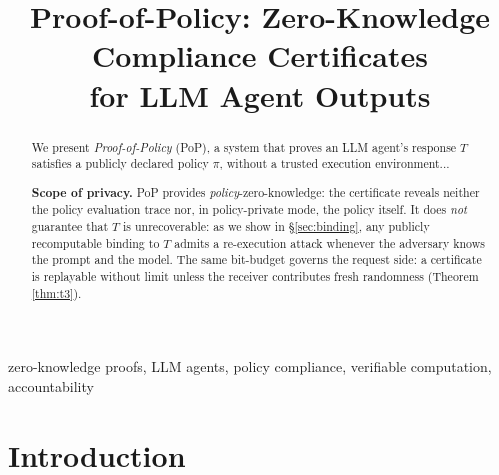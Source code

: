 \documentclass[journal]{IEEEtran}
\newcommand{\need}[1]{}
\newcommand{\need}[1]{\textcolor{blue}{[[ NEED: #1 ]]}}
\begin{document}
\title{Proof-of-Policy: Zero-Knowledge Compliance Certificates\\ for LLM Agent Outputs}

\author{\need{authors}}
\maketitle

\begin{abstract}
We present \emph{Proof-of-Policy} (PoP), a system that proves an LLM agent's
response $T$ satisfies a publicly declared policy $\pi$, without a trusted
execution environment...
\need{一句完整的贡献陈述（对应 D1 的"分析 x 系统各半"）}

\smallskip
\noindent\textbf{Scope of privacy.} PoP provides \emph{policy}-zero-knowledge:
the certificate reveals neither the policy evaluation trace nor, in
policy-private mode, the policy itself. It does \emph{not} guarantee that $T$
is unrecoverable: as we show in \S\ref{sec:binding}, any publicly recomputable
binding to $T$ admits a re-execution attack whenever the adversary knows the
prompt and the model. The same bit-budget governs the request side: a
certificate is replayable without limit unless the receiver contributes fresh
randomness (Theorem \ref{thm:t3}).
\end{abstract}

\begin{IEEEkeywords}
zero-knowledge proofs, LLM agents, policy compliance, verifiable computation,
accountability
\end{IEEEkeywords}

\section{Introduction}
\label{sec:intro}

\need{Contribution list. 必须包含下面这条"不主张"声明：}
\end{document}
